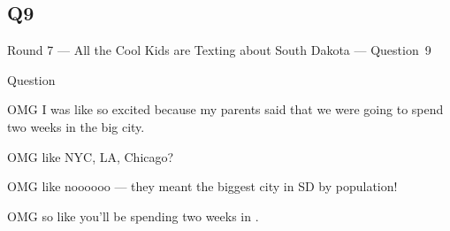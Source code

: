 \documentclass[11pt]{beamer}
\begin{document}
\subsection*{Q9}
\begin{frame}[t]{Round 7 --- All the Cool Kids are Texting about South Dakota --- \mbox{Question 9}}
\begin{block}{Question}

\begin{minipage}{0.9\textwidth}
\begin{mdframed}[
    roundcorner=7pt,
    backgroundcolor=black!5,
    linecolor=black!5,
    fontcolor=black,
    ignorelastdescenders]
\begin{flushleft}
{\small{}\selectfont{}
OMG I was like so excited because my parents said that we were going to spend two weeks in the big city.
}
\end{flushleft}
\end{mdframed}
\end{minipage}

\hfill{}\begin{minipage}{0.9\textwidth}
\begin{mdframed}[
    roundcorner=7pt,
    backgroundcolor=blue!80!white,
    linecolor=blue!80!white,
    fontcolor=white,
    ignorelastdescenders]
\begin{flushleft}
{\small{}\selectfont{}
OMG like NYC, LA, Chicago?
}
\end{flushleft}
\end{mdframed}
\end{minipage}

\begin{minipage}{0.9\textwidth}
\begin{mdframed}[
    roundcorner=7pt,
    backgroundcolor=black!5,
    linecolor=black!5,
    fontcolor=black,
    ignorelastdescenders]
\begin{flushleft}
{\small{}\selectfont{}
OMG like noooooo --- they meant the biggest city in SD by population!
}
\end{flushleft}
\end{mdframed}
\end{minipage}

\hfill{}\begin{minipage}{0.9\textwidth}
\begin{mdframed}[
    roundcorner=7pt,
    backgroundcolor=blue!80!white,
    linecolor=blue!80!white,
    fontcolor=white,
    ignorelastdescenders]
\begin{flushleft}
{\small{}\selectfont{}
OMG so like you'll be spending two weeks in \textunderscore{}\textunderscore{}\textunderscore{}\textunderscore{}\textunderscore{}\textunderscore{} \textunderscore{}\textunderscore{}\textunderscore{}\textunderscore{}\textunderscore{}\textunderscore{}.
}
\end{flushleft}
\end{mdframed}
\end{minipage}
\end{block}
\end{frame}
\end{document}
